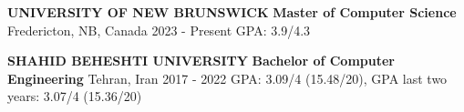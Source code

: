 \begin{cventries}
    \cventry
    {\textbf {UNIVERSITY OF NEW BRUNSWICK}}
    {\textbf {Master of Computer Science}}
    {Fredericton, NB, Canada}
    {2023 - Present}
    {GPA: 3.9/4.3}
    
\end{cventries}

\begin{cventries}
    \cventry
    {\textbf {SHAHID BEHESHTI UNIVERSITY}}
    {\textbf {Bachelor of Computer Engineering}}
    {Tehran, Iran}
    {2017 - 2022}
    {GPA: 3.09/4 (15.48/20), GPA last two years: 3.07/4 (15.36/20)}
    
\end{cventries}